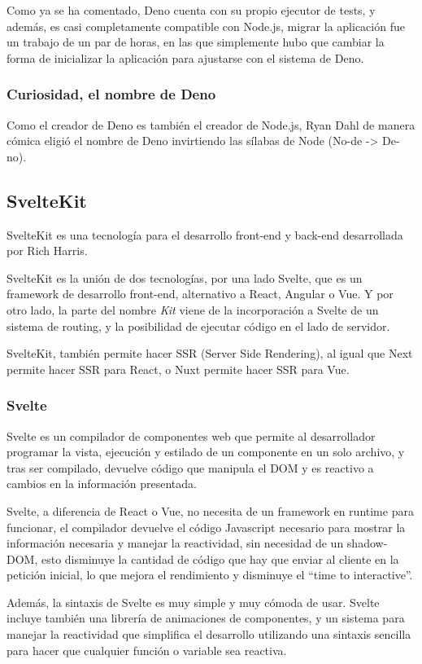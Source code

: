 Como ya se ha comentado, Deno cuenta con su propio ejecutor de tests, y además, es casi completamente compatible con Node.js, migrar la aplicación fue un trabajo de un par de horas, en las que simplemente hubo que cambiar la forma de inicializar la aplicación para ajustarse con el sistema de Deno.

\subsubsection{Curiosidad, el nombre de Deno}
Como el creador de Deno es también el creador de Node.js, Ryan Dahl de manera cómica eligió el nombre de Deno invirtiendo las sílabas de Node (No-de -> De-no).


\subsection{SvelteKit}
SvelteKit \cite{sveltekit_docs} es una tecnología para el desarrollo front-end y back-end desarrollada por Rich Harris.

SvelteKit es la unión de dos tecnologías, por una lado Svelte, que es un framework de desarrollo front-end, alternativo a React, Angular o Vue. Y por otro lado, la parte del nombre \textit{Kit} viene de la incorporación a Svelte de un sistema de routing, y la posibilidad de ejecutar código en el lado de servidor.

SvelteKit, también permite hacer SSR (Server Side Rendering), al igual que Next permite hacer SSR para React, o Nuxt permite hacer SSR para Vue.

\subsubsection{Svelte}
Svelte \cite{svelte_docs} es un compilador de componentes web que permite al desarrollador programar la vista, ejecución y estilado de un componente en un solo archivo, y tras ser compilado, devuelve código que manipula el DOM y es reactivo a cambios en la información presentada.

Svelte, a diferencia de React o Vue, no necesita de un framework en runtime para funcionar, el compilador devuelve el código Javascript necesario para mostrar la información necesaria y manejar la reactividad, sin necesidad de un shadow-DOM, esto disminuye la cantidad de código que hay que enviar al cliente en la petición inicial, lo que mejora el rendimiento y disminuye el “time to interactive”.

Además, la sintaxis de Svelte es muy simple y muy cómoda de usar. Svelte incluye también una librería de animaciones de componentes, y un sistema para manejar la reactividad que simplifica el desarrollo utilizando una sintaxis sencilla para hacer que cualquier función o variable sea reactiva.

